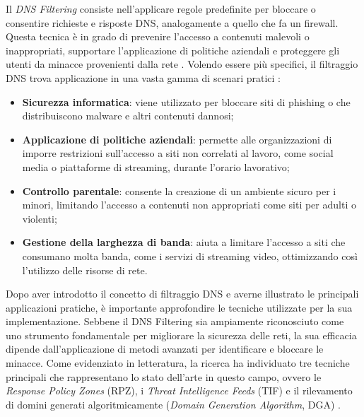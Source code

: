 Il \textit{DNS Filtering} consiste nell'applicare regole predefinite per bloccare o consentire richieste e risposte DNS, analogamente a quello che fa un firewall. Questa tecnica è in grado di prevenire l'accesso a contenuti malevoli o inappropriati, supportare l'applicazione di politiche aziendali e proteggere gli utenti da minacce provenienti dalla rete \cite{DBLP:journals/corr/abs-2401-03864}. Volendo essere più specifici, il filtraggio DNS trova applicazione in una vasta gamma di scenari pratici \cite{Murdoch2008,DBLP:journals/ieeesp/Varadharajan10}:
\begin{itemize}
  \item \textbf{Sicurezza informatica}: viene utilizzato per bloccare siti di phishing o che distribuiscono malware e altri contenuti dannosi;

  \item \textbf{Applicazione di politiche aziendali}: permette alle organizzazioni di imporre restrizioni sull'accesso a siti non correlati al lavoro, come social media o piattaforme di streaming, durante l'orario lavorativo;

  \item \textbf{Controllo parentale}: consente la creazione di un ambiente sicuro per i minori, limitando l'accesso a contenuti non appropriati come siti per adulti o violenti;

  \item \textbf{Gestione della larghezza di banda}: aiuta a limitare l'accesso a siti che consumano molta banda, come i servizi di streaming video, ottimizzando così l'utilizzo delle risorse di rete.
\end{itemize}

Dopo aver introdotto il concetto di filtraggio DNS e averne illustrato le principali applicazioni pratiche, è importante approfondire le tecniche utilizzate per la sua implementazione. Sebbene il DNS Filtering sia ampiamente riconosciuto come uno strumento fondamentale per migliorare la sicurezza delle reti, la sua efficacia dipende dall'applicazione di metodi avanzati per identificare e bloccare le minacce. Come evidenziato in letteratura, la ricerca ha individuato tre tecniche principali che rappresentano lo stato dell'arte in questo campo, ovvero le \textit{Response Policy Zones} (RPZ), i \textit{Threat Intelligence Feeds} (TIF) e il rilevamento di domini generati algoritmicamente (\textit{Domain Generation Algorithm}, DGA) \cite{DBLP:journals/corr/abs-2401-03864}.

